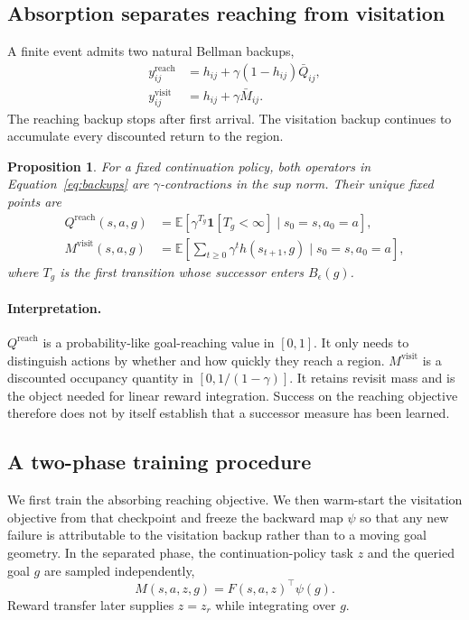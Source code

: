 \documentclass{article}
\newcommand{\E}{\mathbb{E}}
\newcommand{\ind}[1]{\mathbf{1}\!\left[#1\right]}
\newcommand{\Reach}{\mathrm{reach}}
\newcommand{\Visit}{\mathrm{visit}}
\newtheorem{proposition}{Proposition}
\begin{document}
\subsection{Absorption separates reaching from visitation}
\label{sec:backups}

A finite event admits two natural Bellman backups,
\begin{align}
\label{eq:backups}
y^{\Reach}_{ij}
&=
h_{ij}+\gamma(1-h_{ij})\bar Q_{ij},
\\
y^{\Visit}_{ij}
&=
h_{ij}+\gamma\bar M_{ij}.
\end{align}
The reaching backup stops after first arrival. The visitation backup continues to
accumulate every discounted return to the region.

\begin{proposition}
\label{prop:fixed-points}
For a fixed continuation policy, both operators in
Equation~\ref{eq:backups} are $\gamma$-contractions in the sup norm. Their unique
fixed points are
\begin{align}
Q^{\Reach}(s,a,g)
&=
\E\left[\gamma^{T_g}\ind{T_g<\infty}\mid s_0=s,a_0=a\right],
\\
M^{\Visit}(s,a,g)
&=
\E\left[\sum_{t\ge0}\gamma^t h(s_{t+1},g)
\mid s_0=s,a_0=a\right],
\end{align}
where $T_g$ is the first transition whose successor enters $B_\epsilon(g)$.
\end{proposition}

\paragraph{Interpretation.}
$Q^{\Reach}$ is a probability-like goal-reaching value in $[0,1]$. It only needs
to distinguish actions by whether and how quickly they reach a region.
$M^{\Visit}$ is a discounted occupancy quantity in $[0,1/(1-\gamma)]$. It retains
revisit mass and is the object needed for linear reward integration. Success on
the reaching objective therefore does not by itself establish that a successor
measure has been learned.

\subsection{A two-phase training procedure}

We first train the absorbing reaching objective. We then warm-start the visitation
objective from that checkpoint and freeze the backward map $\psi$ so that any new
failure is attributable to the visitation backup rather than to a moving goal
geometry. In the separated phase, the continuation-policy task $z$ and the queried
goal $g$ are sampled independently,
\begin{equation}
M(s,a,z,g)=F(s,a,z)^{\top}\psi(g).
\end{equation}
Reward transfer later supplies $z=z_r$ while integrating over $g$.
\end{document}

